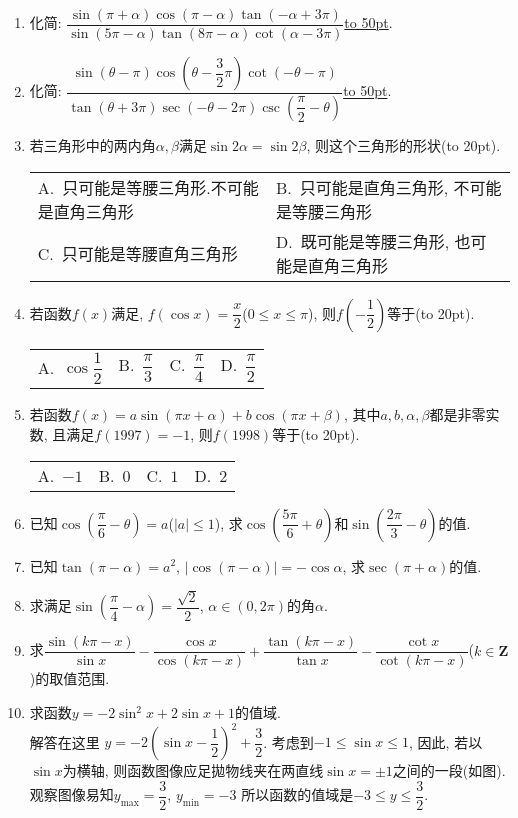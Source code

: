 \documentclass[10pt,a4paper]{article}
\newcommand{\blank}[1]{\underline{\hbox to #1pt{}}}
\newcommand{\bracket}[1]{(\hbox to #1pt{})}
\newcommand{\twoch}[4]{\par\begin{tabular}{p{.46\textwidth}p{.46\textwidth}}
A.~#1& B.~#2\\
C.~#3& D.~#4
\end{tabular}}
\newcommand{\fourch}[4]{\par\begin{tabular}{p{.23\textwidth}p{.23\textwidth}p{.23\textwidth}p{.23\textwidth}}
A.~#1 &B.~#2& C.~#3& D.~#4
\end{tabular}}
\begin{document}
\begin{enumerate}[1.]
\item 化简: $\dfrac{\sin (\pi +\alpha)\cos (\pi -\alpha)\tan (-\alpha +3\pi)}{\sin (5\pi -\alpha)\tan (8\pi -\alpha)\cot (\alpha -3\pi)}$\blank{50}.
\item 化简: $\dfrac{\sin (\theta -\pi)\cos (\theta -\dfrac 32\pi)\cot (-\theta -\pi)}{\tan (\theta +3\pi)\sec (-\theta -2\pi)\csc (\dfrac{\pi}2-\theta)}$\blank{50}.
\item 若三角形中的两内角$\alpha ,\beta$满足$\sin 2\alpha =\sin 2\beta$, 则这个三角形的形状\bracket{20}.
\twoch{只可能是等腰三角形.不可能是直角三角形}{只可能是直角三角形, 不可能是等腰三角形}{只可能是等腰直角三角形}{既可能是等腰三角形, 也可能是直角三角形}
\item 若函数$f(x)$满足, $f(\cos x)=\dfrac x2$($0\le x\le \pi$), 则$f(-\dfrac 12)$等于\bracket{20}.
\fourch{$\cos \dfrac 12$}{$\dfrac{\pi}3$}{$\dfrac{\pi}4$}{$\dfrac{\pi}2$}
\item 若函数$f(x)=a\sin (\pi x+\alpha)+b\cos (\pi x+\beta)$, 其中$a,b,\alpha ,\beta$都是非零实数, 且满足$f(1997)=-1$, 则$f(1998)$等于\bracket{20}.
\fourch{$-1$}{$0$}{$1$}{$2$}
\item 已知$\cos (\dfrac{\pi}6-\theta)=a$($|a|\le 1$), 求$\cos (\dfrac{5\pi}6+\theta)$和$\sin (\dfrac{2\pi}3-\theta)$的值.
\item 已知$\tan (\pi -\alpha)=a^2$, $|\cos (\pi -\alpha)|=-\cos \alpha$, 求$\sec (\pi +\alpha)$的值.
\item 求满足$\sin (\dfrac{\pi}4-\alpha)=\dfrac{\sqrt 2}2$, $\alpha \in (0,2\pi)$的角$\alpha$.
\item 求$\dfrac{\sin (k\pi -x)}{\sin x}-\dfrac{\cos x}{\cos (k\pi -x)}+\dfrac{\tan (k\pi -x)}{\tan x}-\dfrac{\cot x}{\cot (k\pi -x)}$($k\in \mathbf{Z}$)的取值范围.
\item 求函数$y=-2\sin ^2x+2\sin x+1$的值域.\\
解答在这里  $y=-2(\sin x-\dfrac 12)^2+\dfrac 32$.
考虑到$-1\le \sin x\le 1$, 因此, 若以$\sin x$为横轴, 则函数图像应足拋物线夹在两直线$\sin x=\pm 1$之间的一段(如图).观察图像易知$y_{\max}=\dfrac 32$, $y_{\min}=-3$
所以函数的值域是$-3\le y\le \dfrac 32$.
\begin{center}
\end{center}
\end{enumerate}
\end{document}
